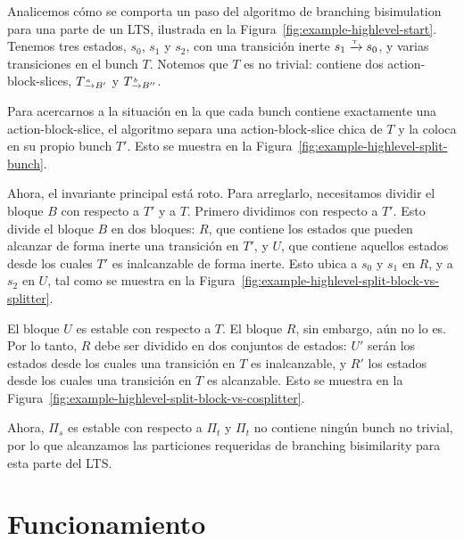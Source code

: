 \begin{example}
Analicemos cómo se comporta un paso del algoritmo de branching bisimulation para una parte de un LTS, ilustrada en la Figura~\ref{fig:example-highlevel-start}. Tenemos tres estados, $s_0$, $s_1$ y $s_2$, con una transición inerte $s_1 \pijl{\tau} s_0$, y varias transiciones en el bunch $T$. Notemos que $T$ es no trivial: contiene dos action-block-slices, $T_{\pijl{a}B'}$ y $T_{\pijl{b}B''}$.

Para acercarnos a la situación en la que cada bunch contiene exactamente una action-block-slice, el algoritmo separa una action-block-slice chica de $T$ y la coloca en su propio bunch $T'$. Esto se muestra en la Figura~\ref{fig:example-highlevel-split-bunch}.

Ahora, el invariante principal está roto. Para arreglarlo, necesitamos dividir el bloque $B$ con respecto a $T'$ y a $T$. Primero dividimos con respecto a $T'$. Esto divide el bloque $B$ en dos bloques: $R$, que contiene los estados que pueden alcanzar de forma inerte una transición en $T'$, y $U$, que contiene aquellos estados desde los cuales $T'$ es inalcanzable de forma inerte. Esto ubica a $s_0$ y $s_1$ en $R$, y a $s_2$ en $U$, tal como se muestra en la Figura~\ref{fig:example-highlevel-split-block-vs-splitter}.

El bloque $U$ es estable con respecto a $T$. El bloque $R$, sin embargo, aún no lo es.
Por lo tanto, $R$ debe ser dividido en dos conjuntos de estados: $U'$ serán los estados desde los cuales una transición en $T$ es inalcanzable, y $R'$ los estados desde los cuales una transición en $T$ es alcanzable. Esto se muestra en la Figura~\ref{fig:example-highlevel-split-block-vs-cosplitter}.

Ahora, $\Pi_s$ es estable con respecto a $\Pi_t$ y $\Pi_t$ no contiene ningún bunch no trivial, por lo que alcanzamos las particiones requeridas de branching bisimilarity para esta parte del LTS.
\end{example}

\section{Funcionamiento}
\label{sec:funcionamiento}

